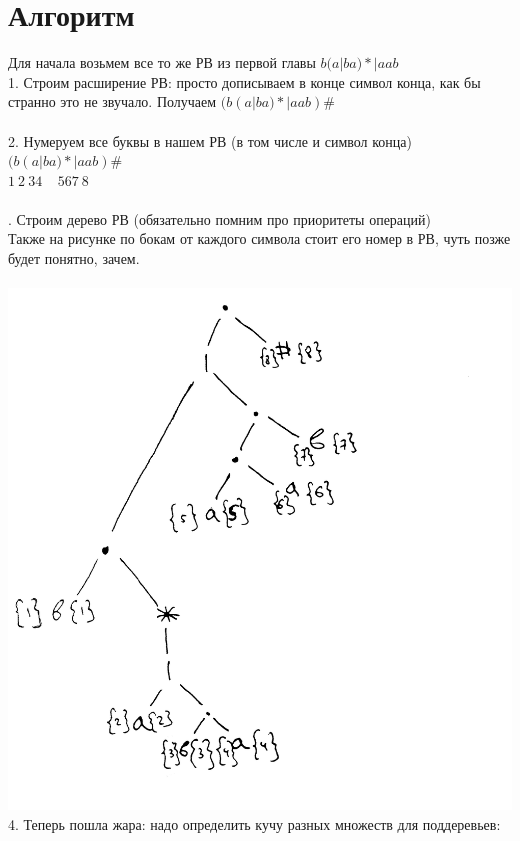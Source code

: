 \documentclass[14pt]{extreport}
\begin{document}
	\section*{Алгоритм}
	Для начала возьмем все то же РВ из первой главы $b(a|ba)*|aab$\\
	1. Строим расширение РВ: просто дописываем в конце символ конца, как бы странно
	это не звучало. Получаем $(b(a|ba)*|aab)\#$\\\\
	2. Нумеруем все буквы в нашем РВ (в том числе и символ конца)\\
	$(b(a|ba)*|aab)\#$\\
	\hspace*{5pt}$1\ 2\ 34\ \ \ \ \ 567\ 8$\\\\
	. Строим дерево РВ (обязательно помним про приоритеты операций)\\
	Также на рисунке по бокам от каждого символа стоит его номер в РВ, чуть позже
	будет понятно, зачем.\\\\
	\includegraphics[scale=0.13]{data/pic3_1.png}\\
	4. Теперь пошла жара: надо определить кучу разных множеств для поддеревьев:\\\\
\end{document}
